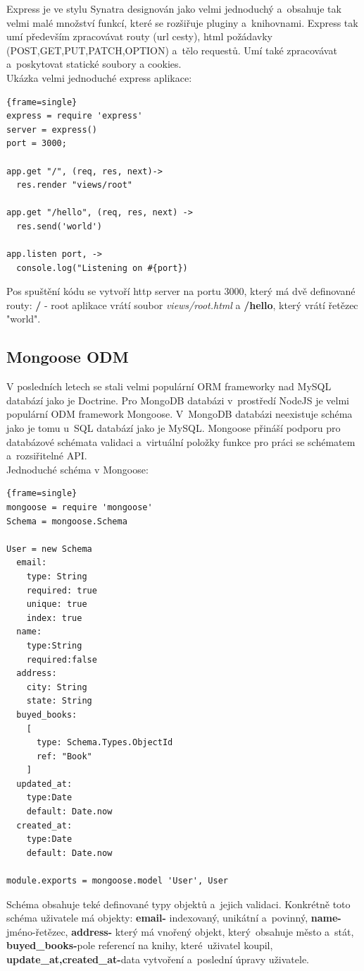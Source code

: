 \documentclass[a4paper,12pt,twoside,BCOR=10mm]{article}
\renewcommand{\b}[1]{\textbf{#1}} %
\renewcommand{\it}[1]{\textit{#1}}    %
\newenvironment{codeframe}{%
  \begin{Sbox} 
    \begin{minipage} 
      {\columnwidth-\leftmargin-\rightmargin-2\fboxsep-2\fboxrule-4pt} 
}{%

  \end{minipage} 
  \end{Sbox} 
  \begin{center} 
    \fcolorbox{black}{codeback}{\TheSbox} 
  \end{center} 
}
\begin{document}
Express je ve stylu Synatra designován jako velmi jednoduchý a~obsahuje tak velmi malé množství funkcí, které se rozšiřuje pluginy a~knihovnami. Express tak umí především zpracovávat routy (url cesty), html požádavky (POST,GET,PUT,PATCH,OPTION) a~tělo requestů. Umí také zpracovávat a~poskytovat statické soubory a cookies.\cite{expressjs}\\

Ukázka velmi jednoduché express aplikace:
     \begin{codeframe} 
      \begin{Verbatim}{frame=single}
express = require 'express'
server = express()
port = 3000;

app.get "/", (req, res, next)->
  res.render "views/root"

app.get "/hello", (req, res, next) ->
  res.send('world')

app.listen port, ->
  console.log("Listening on #{port})
\end{Verbatim} 
    \end{codeframe}
Pos spuštění kódu se vytvoří http server na portu 3000, který má dvě definované routy: \b{/} - root aplikace vrátí soubor \it{views/root.html} a \b{/hello}, který vrátí řetězec "world".

\subsection{Mongoose ODM}
V posledních letech se stali velmi populární ORM frameworky nad MySQL databází jako je Doctrine. Pro MongoDB databázi v~prostředí NodeJS je velmi populární ODM framework Mongoose. V~MongoDB databázi neexistuje schéma jako je tomu u~SQL databází jako je MySQL. Mongoose přináší podporu pro databázové schémata validaci a~virtuální položky funkce pro práci se schématem a~rozsiřitelné API. \\

Jednoduché schéma v Mongoose:

     \begin{codeframe} 
      \begin{Verbatim}{frame=single}
mongoose = require 'mongoose'
Schema = mongoose.Schema

User = new Schema
  email:
    type: String
    required: true
    unique: true
    index: true
  name:
    type:String
    required:false
  address:
    city: String
    state: String
  buyed_books:
    [
      type: Schema.Types.ObjectId
      ref: "Book"
    ]
  updated_at:
    type:Date
    default: Date.now
  created_at:
    type:Date
    default: Date.now

module.exports = mongoose.model 'User', User
\end{Verbatim} 
    \end{codeframe}
Schéma obsahuje teké definované typy objektů a~jejich validaci. Konkrétně toto schéma uživatele má objekty: \b{email-} indexovaný, unikátní a~povinný, \b{name-} jméno-řetězec, \b{address-} který má vnořený objekt, který~obsahuje město a~stát, \b{buyed\_books-}pole referencí na knihy, které~uživatel koupil, \b{update\_at,created\_at-}data vytvoření a~poslední úpravy uživatele.
\end{document}
